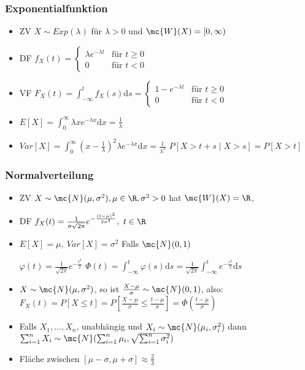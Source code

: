 \subsubsection{Exponentialfunktion}
\begin{itemize}
    \item ZV $X \sim Exp(\lambda)$ für $\lambda > 0$ und $\mc{W}(X) = [0, \infty)$
    \item DF $f_X(t) =
\begin{cases}
    \lambda e ^{-\lambda t} &\text{für } t \ge 0\\
    0 & \text{für } t < 0
\end{cases}$
    \item VF $F_X(t) = \int_{-\infty}^{t} f_X(s) \mathrm{d}s =
\begin{cases}
    1 - e^{- \lambda t} &\text{für } t \ge 0\\
    0 &\text{für } t < 0
\end{cases}$
    \item $E[X] = \int_{0}^{\infty} \lambda x e^{-\lambda x} \mathrm{d}x = \frac{1}{\lambda}$
    \item $Var[X] = \int_{0}^{\infty} (x - \frac{1}{\lambda})^2 \lambda e^{-\lambda x} \mathrm{d}x = \frac{1}{\lambda^2}$
     $P[X > t + s \mid X > s] = P[X > t]$
\end{itemize}

\subsubsection{Normalverteilung}
\begin{itemize}
    \item ZV $X \sim \mc{N}(\mu, \sigma^2), \mu \in \R, \sigma^2 > 0$ hat $\mc{W}(X) = \R$, 
    \item DF $f_X(t) = \frac{1}{\sigma \sqrt{2 \pi}} e^{- \frac{(t - \mu)^2}{2 \sigma^2}}, \ t \in \R$
    \item $E[X] = \mu, \ Var[X] = \sigma^2$
     Falls $\mc{N}(0, 1)$
        \begin{itemize}
             $\varphi(t) = \frac{1}{\sqrt{2 \pi}} e^{-\frac{t^2}{2}}$
             $\Phi(t) = \int_{-\infty}^{t} \varphi(s) \mathrm{d}s = \frac{1}{\sqrt{2 \pi}} \int_{-\infty}^{t} e ^{-\frac{s^2}{2}}\mathrm{d}s$
        \end{itemize}
    \item $X \sim \mc{N}(\mu, \sigma^2)$, so ist $\frac{X - \mu}{\sigma} \sim \mc{N}(0, 1)$, also: $F_X(t) = P[X \le t] = P[\frac{X - \mu}{\sigma} \le \frac{t - \mu}{\sigma}] = \Phi(\frac{t - \mu}{\sigma})$
    \item Falls $X_1, \dots, X_n$, unabhängig und $X_i \sim \mc{N}(\mu_i, \sigma_i^2)$ dann $\sum_{i=1}^n X_i \sim \mc{N}(\sum_{i=1}^n \mu_i, \sqrt{\sum_{i=1}^n \sigma_i^2})$
    \item Fläche zwischen $[\mu - \sigma, \mu + \sigma] \approx \frac{2}{3}$
\end{itemize}

